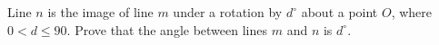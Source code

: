Line $n$ is the image of line $m$ under a rotation by $d^\circ$ about a point $O$, where $0<d\le 90$. Prove that the angle between lines $m$ and $n$ is $d^\circ$.
